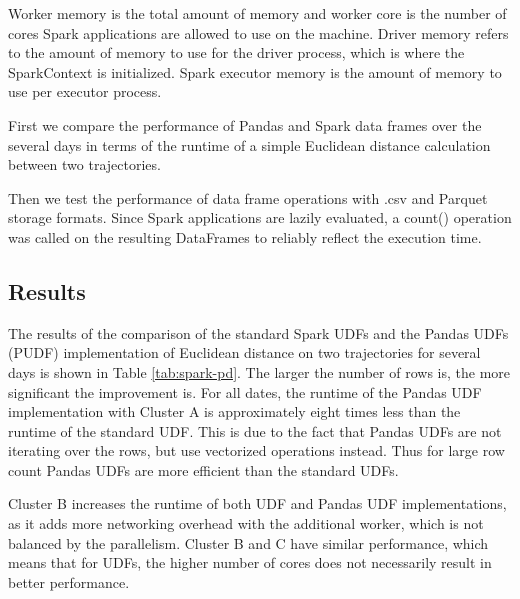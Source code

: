 Worker memory is the total amount of memory and worker core is the number of cores Spark applications are allowed to use on the machine. Driver memory refers to the amount of memory to use for the driver process, which is where the SparkContext is initialized. Spark executor memory is the amount of memory to use per executor process. \cite{spark:rdds}

First we compare the performance of Pandas and Spark data frames over the several days in terms of the runtime of a simple Euclidean distance calculation between two trajectories.

Then we test the performance of data frame operations with .csv and Parquet storage formats. Since Spark applications are lazily evaluated, a count() operation was called on the resulting DataFrames to reliably reflect the execution time.

\subsection{Results}
The results of the comparison of the standard Spark UDFs and the Pandas UDFs (PUDF) implementation of Euclidean distance on two trajectories for several days is shown in Table \ref{tab:spark-pd}. The larger the number of rows is, the more significant the improvement is. For all dates, the runtime of the Pandas UDF implementation with Cluster A is approximately eight times less than the runtime of the standard UDF. This is due to the fact that Pandas UDFs are not iterating over the rows, but use vectorized operations instead. Thus for large row count Pandas UDFs are more efficient than the standard UDFs. 

Cluster B increases the runtime of both UDF and Pandas UDF implementations, as it adds more networking overhead with the additional worker, which is not balanced by the parallelism. Cluster B and C have similar performance, which means that for UDFs, the higher number of cores does not necessarily result in better performance.

